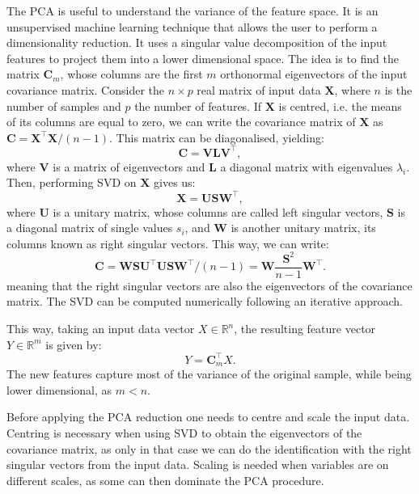 The PCA is useful to understand the variance of the feature space. It is an unsupervised machine learning technique that allows the user to perform a dimensionality reduction. It uses a singular value decomposition of the input features to project them into a lower dimensional space. The idea is to find the matrix $\mathbf{C}_{m}$, whose columns are the first $m$ orthonormal eigenvectors of the input covariance matrix. Consider the $n \times p$ real matrix of input data $\mathbf{X}$, where $n$ is the number of samples and $p$ the number of features. If $\mathbf{X}$ is centred, i.e. the means of its columns are equal to zero, we can write the covariance matrix of $\mathbf{X}$ as $\mathbf{C}=\mathbf{X}^{\intercal}\mathbf{X}/(n-1)$. This matrix can be diagonalised, yielding:
\begin{equation}
	\mathbf{C}=\mathbf{V}\mathbf{L}\mathbf{V}^{\intercal},
\end{equation}
where $\mathbf{V}$ is a matrix of eigenvectors and $\mathbf{L}$ a diagonal matrix with eigenvalues $\lambda_{i}$. Then, performing SVD on $\mathbf{X}$ gives us:
\begin{equation}
	\mathbf{X}=\mathbf{U}\mathbf{S}\mathbf{W}^{\intercal},
\end{equation}
where $\mathbf{U}$ is a unitary matrix, whose columns are called left singular vectors, $\mathbf{S}$ is a diagonal matrix of single values $s_{i}$, and $\mathbf{W}$ is another unitary matrix, its columns known as right singular vectors. This way, we can write:
\begin{equation}
	\mathbf{C}=\mathbf{W}\mathbf{S}\mathbf{U}^{\intercal}\mathbf{U}\mathbf{S}\mathbf{W}^{\intercal}/(n-1)=\mathbf{W}\frac{\mathbf{S}^{2}}{n-1}\mathbf{W}^{\intercal}.
\end{equation}
meaning that the right singular vectors are also the eigenvectors of the covariance matrix. The SVD can be computed numerically following an iterative approach.

This way, taking an input data vector $X \in \mathbb{R}^{n}$, the resulting feature vector $Y \in \mathbb{R}^{m}$ is given by:
\begin{equation}
	Y = \mathbf{C}_{m}^{\intercal} X.
\end{equation}
The new features capture most of the variance of the original sample, while being lower dimensional, as $m<n$.

Before applying the PCA reduction one needs to centre and scale the input data. Centring is necessary when using SVD to obtain the eigenvectors of the covariance matrix, as only in that case we can do the identification with the right singular vectors from the input data. Scaling is needed when variables are on different scales, as some can then dominate the PCA procedure.

